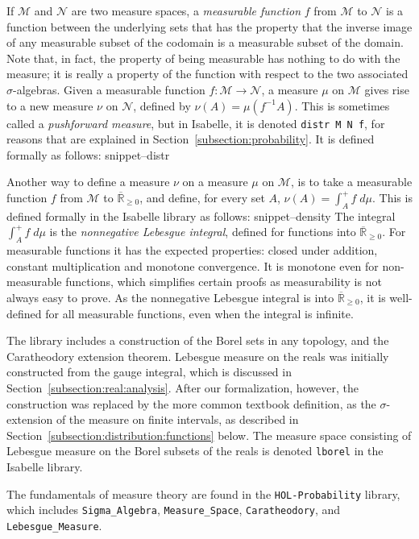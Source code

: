 \documentclass{svjour3}
\newcommand{\ennRR}{\overline{\mathbb{R}}_{\ge 0}}
\newcommand{\mdl}[1]{{\mathcal #1}} %
\newcommand{\Snippet}[1]{\csname snippet--#1\endcsname}
\begin{document}
If $\mdl M$ and $\mdl N$ are two measure spaces, a \emph{measurable function} $f$ from $\mdl M$ to $\mdl N$ is a function between the underlying sets that has the property that the inverse image of any measurable subset of the codomain is a measurable subset of the domain. Note that, in fact, the property of being measurable has nothing to do with the measure; it is really a property of the function with respect to the two associated $\sigma$-algebras. Given a measurable function $f : \mdl M \to \mdl N$, a measure $\mu$ on $\mdl M$ gives rise to a new measure $\nu$ on $\mdl N$, defined by $\nu(A) = \mu(f^{-1} A)$. This is sometimes called a \emph{pushforward measure}, but in Isabelle, it is denoted \texttt{distr M N f}, for reasons that are explained in Section~\ref{subsection:probability}. It is defined formally as follows:
\Snippet{distr}

Another way to define a measure $\nu$ on a measure $\mu$ on $\mdl M$, is to take a measurable function $f$ from $\mdl M$ to $\ennRR$, and define, for every set $A$, $\nu(A) = \int_A^+ f \; d\mu$. This is defined formally in the Isabelle library as follows:
\Snippet{density}
The integral $\int_A^+ f \; d\mu$ is the \emph{nonnegative Lebesgue integral}, defined for functions into $\ennRR$. For measurable functions it has the expected properties: closed under addition, constant multiplication and monotone convergence. It is monotone even for non-measurable functions, which simplifies certain proofs as measurability is not always easy to prove. As the nonnegative Lebesgue integral is into $\ennRR$, it is well-defined for all measurable functions, even when the integral is infinite.

The library includes a construction of the Borel sets in any topology, and the Caratheodory extension theorem. Lebesgue measure on the reals was initially constructed from the gauge integral, which is discussed in Section~\ref{subsection:real:analysis}. After our formalization, however, the construction was replaced by the more common textbook definition, as the $\sigma$-extension of the measure on finite intervals, as described in Section~\ref{subsection:distribution:functions} below. The measure space consisting of Lebesgue measure on the Borel subsets of the reals is denoted \texttt{lborel} in the Isabelle library. 

The fundamentals of measure theory are found in the \texttt{HOL-Probability} library, which includes \verb=Sigma_Algebra=, \verb=Measure_Space=, \verb=Caratheodory=, and \verb=Lebesgue_Measure=.
\end{document}
